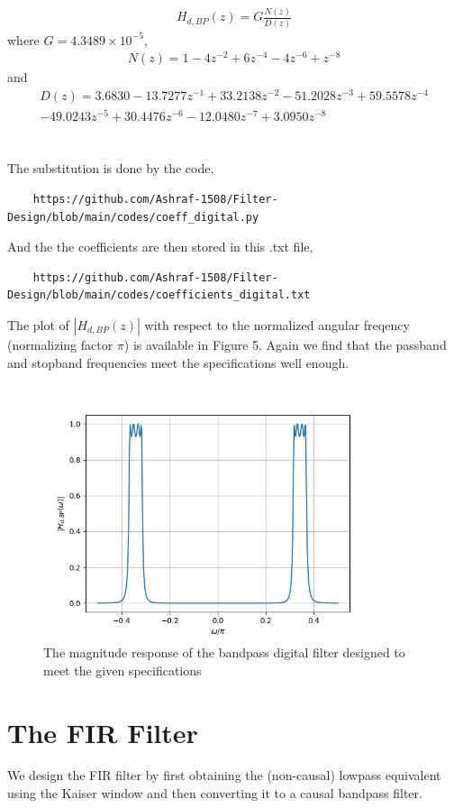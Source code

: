 \documentclass[journal,12pt,twocolumn]{IEEEtran}
\theoremstyle{remark}
\begin{document}
\begin{eqnarray}
H_{d,BP}(z) = G \frac{N(z)}{D(z)}
\end{eqnarray}
where $G = 4.3489 \times 10^{-5}$,
\begin{eqnarray}
N(z)=  1 - 4 z^{-2} + 6 z^{-4} - 4z^{-6} + z^{-8} 
\end{eqnarray}
and
{\tiny{\begin{eqnarray}
D(z) = 3.6830  -13.7277z^{-1} + 33.2138z^{-2}  -51.2028z^{-3}+  59.5578z^{-4}\nonumber \\
  -49.0243z^{-5}+   30.4476z^{-6}  -12.0480z^{-7} +   3.0950z^{-8}
\end{eqnarray}}}\\\\
The substitution is done by the code,
\begin{lstlisting}
    https://github.com/Ashraf-1508/Filter-Design/blob/main/codes/coeff_digital.py
\end{lstlisting}
And the the coefficients are then stored in this .txt file,
\begin{lstlisting}
    https://github.com/Ashraf-1508/Filter-Design/blob/main/codes/coefficients_digital.txt
\end{lstlisting}
The plot of $|H_{d,BP}(z)|$ with respect to the normalized angular freqency (normalizing factor $\pi$) is available in Figure 5.  Again we
find that the passband and stopband frequencies meet the specifications well enough.
\begin{figure}
\label{fig4}
\includegraphics[width = 10cm]{figs/figure4.png}
\caption{The magnitude response of the bandpass digital filter designed to meet the given specifications}
\end{figure}    

\section{\textbf{The FIR Filter}}
We design the FIR filter by first obtaining the (non-causal) lowpass equivalent using the Kaiser window
and then
converting it to a causal bandpass filter.
\end{document}
